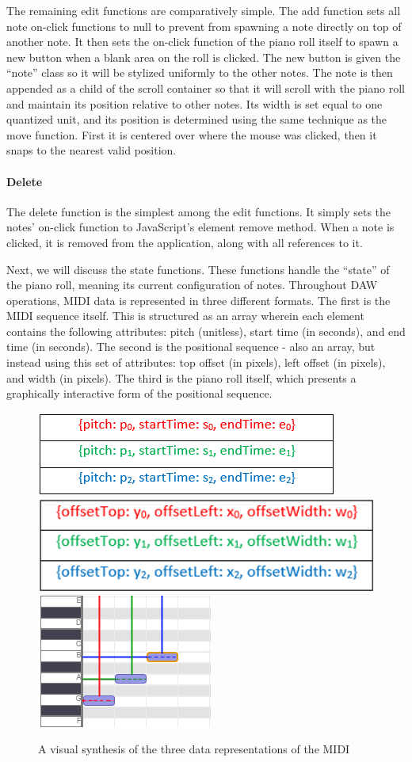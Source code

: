 The remaining edit functions are comparatively simple. The add function sets all note on-click
functions to null to prevent from spawning a note directly on top of another note. It then sets the
on-click function of the piano roll itself to spawn a new button when a blank area on the roll is
clicked. The new button is given the “note” class so it will be stylized uniformly to the other
notes. The note is then appended as a child of the scroll container so that it will scroll with the
piano roll and maintain its position relative to other notes. Its width is set equal to one
quantized unit, and its position is determined using the same technique as the move function. First
it is centered over where the mouse was clicked, then it snaps to the nearest valid position.

\paragraph{Delete}

The delete function is the simplest among the edit functions. It simply sets the notes’ on-click
function to JavaScript’s element remove method. When a note is clicked, it is removed from the
application, along with all references to it.

Next, we will discuss the state functions. These functions handle the “state” of the piano roll,
meaning its current configuration of notes. Throughout DAW operations, MIDI data is represented in
three different formats. The first is the MIDI sequence itself. This is structured as an array
wherein each element contains the following attributes: pitch (unitless), start time (in seconds),
and end time (in seconds). The second is the positional sequence - also an array, but instead using
this set of attributes: top offset (in pixels), left offset (in pixels), and width (in pixels). The
third is the piano roll itself, which presents a graphically interactive form of the positional
sequence.

\begin{figure}[h!]
  \centering
  \includegraphics[width=0.35 \linewidth]{image/MIDIState.png}
  \includegraphics[width=0.35 \linewidth]{image/PositionState.png}
  \includegraphics[width=0.2 \linewidth]{image/RollState.png}
  \caption{A visual synthesis of the three data representations of the MIDI}
  \label{fig:states}
\end{figure}

